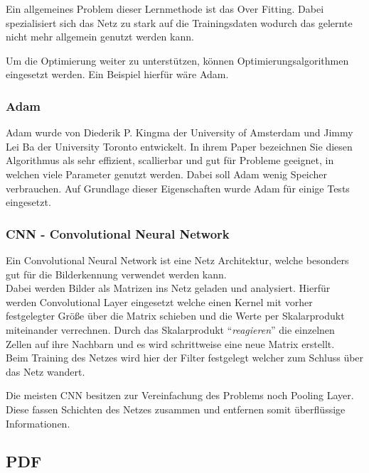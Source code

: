 \documentclass[
]{article}
\begin{document}
Ein allgemeines Problem dieser Lernmethode ist das Over Fitting. Dabei
spezialisiert sich das Netz zu stark auf die Trainingsdaten wodurch das
gelernte nicht mehr allgemein genutzt werden kann.

Um die Optimierung weiter zu unterstützen, können
Optimierungsalgorithmen eingesetzt werden. Ein Beispiel hierfür wäre
Adam.

\hypertarget{header-n55}{%
\subsubsection{Adam}\label{header-n55}}

Adam wurde von Diederik P. Kingma der University of Amsterdam und Jimmy
Lei Ba der University Toronto entwickelt. In ihrem Paper bezeichnen Sie
diesen Algorithmus als sehr effizient, scallierbar und gut für Probleme
geeignet, in welchen viele Parameter genutzt werden. Dabei soll Adam
wenig Speicher verbrauchen. Auf Grundlage dieser Eigenschaften wurde
Adam für einige Tests eingesetzt.

\hypertarget{header-n57}{%
\subsubsection{CNN - Convolutional Neural Network}\label{header-n57}}

Ein Convolutional Neural Network ist eine Netz Architektur, welche
besonders gut für die Bilderkennung verwendet werden kann. \\
Dabei werden Bilder als Matrizen ins Netz geladen und analysiert.
Hierfür werden Convolutional Layer eingesetzt welche einen Kernel mit
vorher festgelegter Größe über die Matrix schieben und die Werte per
Skalarprodukt miteinander verrechnen. Durch das Skalarprodukt
``\emph{reagieren}'' die einzelnen Zellen auf ihre Nachbarn und es wird
schrittweise eine neue Matrix erstellt. \\
Beim Training des Netzes wird hier der Filter festgelegt welcher zum
Schluss über das Netz wandert.

Die meisten CNN besitzen zur Vereinfachung des Problems noch Pooling
Layer. Diese fassen Schichten des Netzes zusammen und entfernen somit
überflüssige Informationen.

\hypertarget{header-n60}{%
\subsection{PDF}\label{header-n60}}
\end{document}
